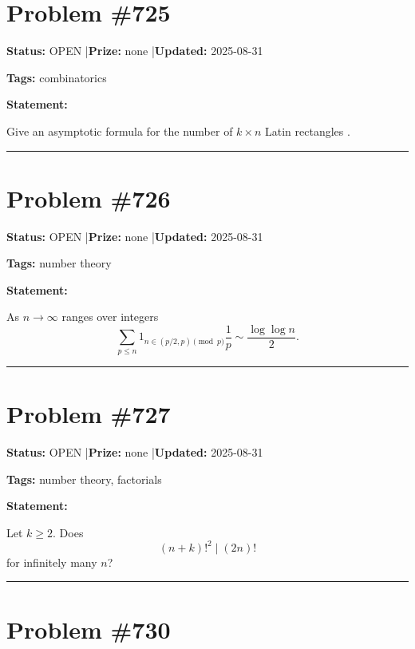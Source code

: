 \documentclass{article}
\begin{document}
\section{Problem \#725}
\label{prob:725}

\noindent\textbf{Status:} OPEN \quad|\quad \textbf{Prize:} none \quad|\quad \textbf{Updated:} 2025-08-31

\noindent\textbf{Tags:} combinatorics

\medskip

\noindent\textbf{Statement:}

Give an asymptotic formula for the number of $k\times n$ Latin rectangles .

\noindent\rule{\linewidth}{0.4pt}


\section{Problem \#726}
\label{prob:726}

\noindent\textbf{Status:} OPEN \quad|\quad \textbf{Prize:} none \quad|\quad \textbf{Updated:} 2025-08-31

\noindent\textbf{Tags:} number theory

\medskip

\noindent\textbf{Statement:}

As $n\to \infty$ ranges over integers\[\sum_{p\leq n}1_{n\in (p/2,p)\pmod{p}}\frac{1}{p}\sim \frac{\log\log n}{2}.\]

\noindent\rule{\linewidth}{0.4pt}


\section{Problem \#727}
\label{prob:727}

\noindent\textbf{Status:} OPEN \quad|\quad \textbf{Prize:} none \quad|\quad \textbf{Updated:} 2025-08-31

\noindent\textbf{Tags:} number theory, factorials

\medskip

\noindent\textbf{Statement:}

Let $k\geq 2$. Does\[(n+k)!^2 \mid (2n)!\]for infinitely many $n$?

\noindent\rule{\linewidth}{0.4pt}


\section{Problem \#730}
\label{prob:730}
\end{document}
